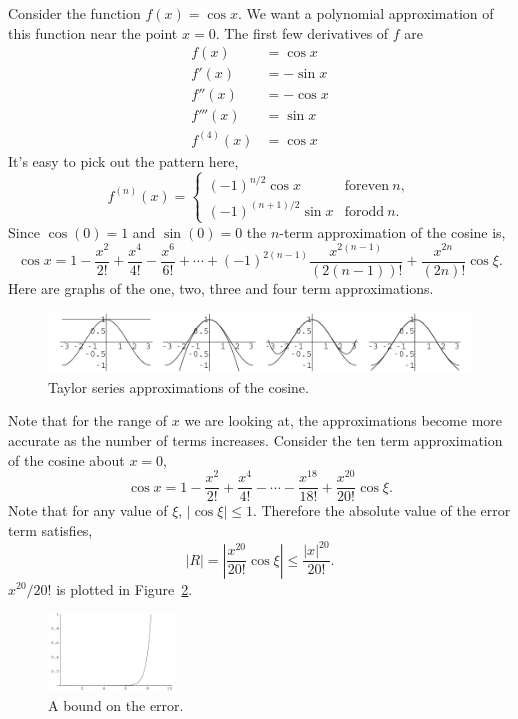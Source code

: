 \begin{Example}
  Consider the function $f(x) = \cos x$.  We want a polynomial approximation of
  this function near the point $x = 0$. The first few derivatives of $f$ are
  \begin{align*}
    f(x) &= \cos x \\
    f'(x) &= - \sin x \\
    f''(x) &= - \cos x \\
    f'''(x) &= \sin x \\
    f^{(4)}(x) &= \cos x
  \end{align*} 
  It's easy to pick out the pattern here,
  \[
  f^{(n)}(x) = 
  \begin{cases}
    (-1)^{n/2} \cos x &\mathrm{for even}\ n, \\
    (-1)^{(n+1)/2} \sin x & \mathrm{for odd}\ n.
  \end{cases}
  \]
  Since $\cos(0) = 1$ and $\sin(0) = 0$ the $n$-term approximation of the
  cosine is,
  \[
  \cos x = 1 - \frac{x^2}{2!} + \frac{x^4}{4!} - \frac{x^6}{6!} + \cdots
  + (-1)^{2(n-1)} \frac{x^{2(n-1)}}{(2(n-1))!} 
  + \frac{x^{2n}}{(2n)!} \cos \xi.
  \]
  Here are graphs of the one, two, three and four term approximations.

  \begin{figure}[h!]
    \begin{center}
      \includegraphics[width=\textwidth]{calculus/differential/taycos4}
    \end{center}
    \caption{Taylor series approximations of the cosine.}
    \label{taycos4}
  \end{figure}

  Note that for the range of $x$ we are looking at, the approximations
  become more accurate as the number of terms increases.
  Consider the ten term approximation of the cosine about $x = 0$,
  \[
  \cos x = 1 - \frac{x^2}{2!} + \frac{x^4}{4!} - \cdots - \frac{x^{18}}{18!} 
  + \frac{x^{20}}{20!} \cos \xi.
  \]
  Note that for any value of $\xi$, $|\cos \xi| \leq 1$.  Therefore the absolute
  value of the error term satisfies,
  \[
  | R | = \left| \frac{x^{20}}{20!} \cos \xi \right| \leq \frac{|x|^{20}}{20!}.
  \]
  $x^{20}/20!$ is plotted in Figure~\ref{taycoser}.

  \begin{figure}[h!]
    \begin{center}
      \includegraphics[width=0.3\textwidth]{calculus/differential/taycoser}
    \end{center}
    \caption{A bound on the error.}
    \label{taycoser}
  \end{figure}


\end{Example}
